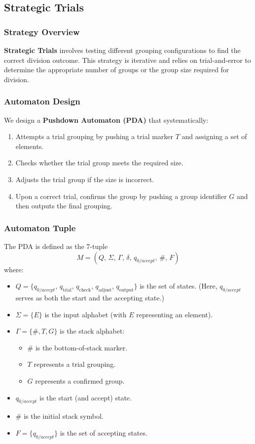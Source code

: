 \documentclass[11pt]{article}
\begin{document}
\subsection*{Strategic Trials}

\subsubsection*{Strategy Overview}
\textbf{Strategic Trials} involves testing different grouping configurations to find the correct division outcome. This strategy is iterative and relies on trial-and-error to determine the appropriate number of groups or the group size required for division.

\subsubsection*{Automaton Design}
We design a \textbf{Pushdown Automaton (PDA)} that systematically:
\begin{enumerate}
    \item Attempts a trial grouping by pushing a trial marker \(T\) and assigning a set of elements.
    \item Checks whether the trial group meets the required size.
    \item Adjusts the trial group if the size is incorrect.
    \item Upon a correct trial, confirms the group by pushing a group identifier \(G\) and then outputs the final grouping.
\end{enumerate}

\subsubsection*{Automaton Tuple}
The PDA is defined as the 7-tuple
\[
M = (Q,\,\Sigma,\,\Gamma,\,\delta,\, q_{0/accept},\, \#,\, F)
\]
where:
\begin{itemize}
    \item \(Q = \{q_{0/accept},\, q_{\text{trial}},\, q_{\text{check}},\, q_{\text{adjust}},\, q_{\text{output}}\}\) is the set of states. (Here, \(q_{0/accept}\) serves as both the start and the accepting state.)
    \item \(\Sigma = \{E\}\) is the input alphabet (with \(E\) representing an element).
    \item \(\Gamma = \{\#, T, G\}\) is the stack alphabet:
    \begin{itemize}
        \item \(\#\) is the bottom-of-stack marker.
        \item \(T\) represents a trial grouping.
        \item \(G\) represents a confirmed group.
    \end{itemize}
    \item \(q_{0/accept}\) is the start (and accept) state.
    \item \(\#\) is the initial stack symbol.
    \item \(F = \{q_{0/accept}\}\) is the set of accepting states.
\end{itemize}
\end{document}
